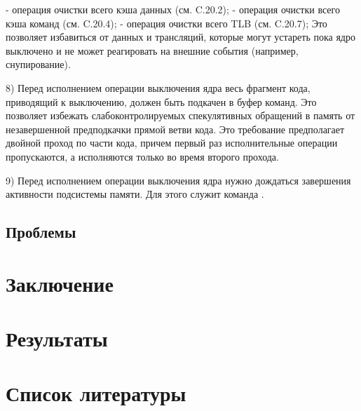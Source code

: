 \documentclass{article}
\begin{document}
	- операция очистки всего кэша данных (см. C.20.2);
	       - операция очистки всего кэша команд (см. C.20.4);
	      - операция очистки всего TLB (см. C.20.7);
Это позволяет избавиться от данных и трансляций, которые могут устареть пока
ядро выключено и не может реагировать на внешние события (например,
снупирование).

8) Перед исполнением операции выключения ядра весь фрагмент кода, приводящий к
выключению, должен быть подкачен в буфер команд. Это позволяет избежать
слабоконтролируемых спекулятивных обращений в память от незавершенной
предподкачки прямой ветви кода. Это требование предполагает двойной проход по
части кода, причем первый раз исполнительные операции пропускаются, а
исполняются только во время второго прохода.

9) Перед исполнением операции выключения ядра нужно дождаться завершения
активности подсистемы памяти. Для этого служит команда {}.

\newpage


\subsection{Проблемы}

\newpage
\section{Заключение}

\section{Результаты}

\newpage
\section{Список литературы}
\end{document}
